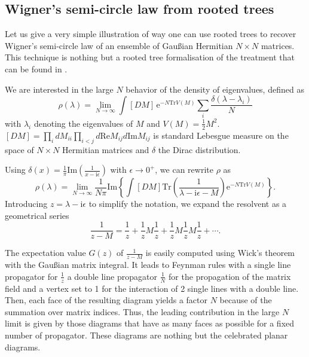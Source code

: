 \documentclass[12pt,here,feynmf]{article}
\begin{document}
\subsection{Wigner's semi-circle law from rooted trees}

Let us give a very simple illustration of way one can use rooted trees to recover Wigner's semi-circle law of an ensemble of Gau\ss ian Hermitian $N\times N$ matrices. This technique is nothing but  a rooted tree formalisation of the treatment that can be found in \cite{zee}. 

We are interested in the large $N$ behavior of the density of eigenvalues, defined as
\begin{equation}
\rho(\lambda)=\lim_{N\rightarrow\infty}\int [DM]\,\mathrm{e}^{-N\mathrm{Tr}V(M)}
\sum_{i}\frac{\delta(\lambda-\lambda_{i})}{N}
\end{equation}
with $\lambda_{i}$ denoting the eigenvalues of $M$ and $V(M)=\frac{1}{2}M^{2}$. $[DM]=\prod_{i}dM_{ii}\prod_{i<j}d\mathrm{Re}M_{ij}d\mathrm{Im}M_{ij}$ is standard Lebesgue measure on the space of $N\times N$ Hermitian matrices and $\delta$ the Dirac distribution.

Using $\delta(x)=\frac{1}{\pi}\mathrm{Im}\left(\frac{1}{x-\mathrm{i}\epsilon}\right)$ with $\epsilon\rightarrow 0^{+}$, we can rewrite $\rho$ as
\begin{equation}
\rho(\lambda)=\lim_{N\rightarrow\infty}\frac{1}{N\pi}\mathrm{Im}\left\{
\int [DM]\mathrm{Tr}\left(\frac{1}{\lambda-\mathrm{i}\epsilon-M}
\right)
\mathrm{e}^{-N\mathrm{Tr}V(M)}\right\}.
\end{equation}
Introducing $z=\lambda-\mathrm{i}\epsilon$ to simplify the notation, we expand the resolvent as a geometrical series 
\begin{equation} 
\frac{1}{z-M}=\frac{1}{z}+\frac{1}{z}M\frac{1}{z}+\frac{1}{z}M\frac{1}{z}M\frac{1}{z}+\cdots.
\end{equation}


The expectation value $G(z)$ of  $\frac{1}{z-M}$ is easily computed using Wick's theorem with the Gau\ss ian matrix integral. It leads to Feynman rules with a single line propagator for $\frac{1}{z}$ a double line propagator $\frac{1}{N}$ for the propagation of the matrix field and a vertex set to 1 for the interaction of 2 single lines with a double line. Then, each face of the resulting diagram yields a factor $N$ because of the summation over matrix indices. Thus, the leading contribution in the large $N$ limit is given by those diagrams that have as many faces as possible for a fixed number of propagator. These diagrams are nothing but the celebrated planar diagrams.
\end{document}
